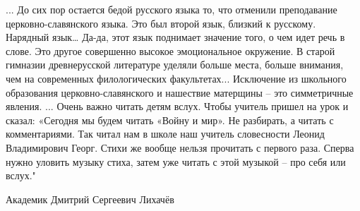 ... До сих пор остается бедой русского языка то, что отменили преподавание церковно-славянского языка. Это был второй язык, близкий к русскому. Нарядный язык… Да-да, этот язык поднимает значение того, о чем идет речь в слове. Это другое совершенно высокое эмоциональное окружение. В старой гимназии древнерусской литературе уделяли больше места, больше внимания, чем на современных филологических факультетах... Исключение из школьного образования церковно-славянского и нашествие матерщины – это симметричные явления.
... Очень важно читать детям вслух. Чтобы учитель пришел на урок и сказал: «Сегодня мы будем читать «Войну и мир». Не разбирать, а читать с комментариями. Так читал нам в школе наш учитель словесности Леонид Владимирович Георг. Стихи же вообще нельзя прочитать с первого раза. Сперва нужно уловить музыку стиха, затем уже читать с этой музыкой – про себя или вслух."

Академик Дмитрий Сергеевич Лихачёв
